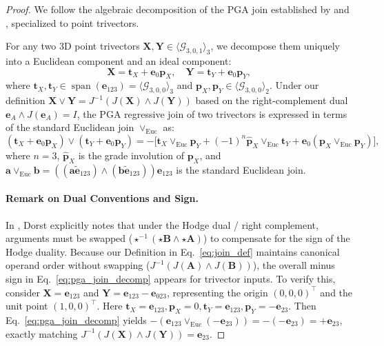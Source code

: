 \documentclass[10pt]{article}
\begin{document}
\begin{proof}
We follow the algebraic decomposition of the PGA join established by \citet[Eq.~35]{pga4cs2020} and \citet[Appendix~A.2, Proposition~7]{gatr}, specialized to point trivectors.

For any two 3D point trivectors $\mathbf{X}, \mathbf{Y} \in \langle \mathcal{G}_{3,0,1} \rangle_3$, we decompose them uniquely into a Euclidean component and an ideal component:
\begin{equation}
    \mathbf{X} = \mathbf{t}_X + \mathbf{e}_0 \mathbf{p}_X, \quad \mathbf{Y} = \mathbf{t}_Y + \mathbf{e}_0 \mathbf{p}_Y,
\end{equation}
where $\mathbf{t}_X, \mathbf{t}_Y \in \operatorname{span}(\mathbf{e}_{123}) = \langle \mathcal{G}_{3,0,0} \rangle_3$ and $\mathbf{p}_X, \mathbf{p}_Y \in \langle \mathcal{G}_{3,0,0} \rangle_2$. Under our definition $\mathbf{X} \vee \mathbf{Y} = J^{-1}(J(\mathbf{X}) \wedge J(\mathbf{Y}))$ based on the right-complement dual $\mathbf{e}_A \wedge J(\mathbf{e}_A) = I$, the PGA regressive join of two trivectors is expressed in terms of the standard Euclidean join $\vee_{\mathrm{Euc}}$ as:
\begin{equation}
    (\mathbf{t}_X + \mathbf{e}_0 \mathbf{p}_X) \vee (\mathbf{t}_Y + \mathbf{e}_0 \mathbf{p}_Y) = -\Big[ \mathbf{t}_X \vee_{\mathrm{Euc}} \mathbf{p}_Y + (-1)^n \hat{\mathbf{p}}_X \vee_{\mathrm{Euc}} \mathbf{t}_Y + \mathbf{e}_0 (\mathbf{p}_X \vee_{\mathrm{Euc}} \mathbf{p}_Y) \Big],
    \label{eq:pga_join_decomp}
\end{equation}
where $n=3$, $\hat{\mathbf{p}}_X$ is the grade involution of $\mathbf{p}_X$, and $\mathbf{a} \vee_{\mathrm{Euc}} \mathbf{b} = ((\mathbf{a} \tilde{\mathbf{e}}_{123}) \wedge (\mathbf{b} \tilde{\mathbf{e}}_{123})) \mathbf{e}_{123}$ is the standard Euclidean join.

\paragraph{Remark on Dual Conventions and Sign.}
In \citet[Eq.~36]{pga4cs2020}, Dorst explicitly notes that under the Hodge dual / right complement, arguments must be swapped ($\star^{-1}(\star \mathbf{B} \wedge \star \mathbf{A})$) to compensate for the sign of the Hodge duality. Because our Definition in Eq.~\ref{eq:join_def} maintains canonical operand order without swapping ($J^{-1}(J(\mathbf{A}) \wedge J(\mathbf{B}))$), the overall minus sign in Eq.~\ref{eq:pga_join_decomp} appears for trivector inputs. To verify this, consider $\mathbf{X} = \mathbf{e}_{123}$ and $\mathbf{Y} = \mathbf{e}_{123} - \mathbf{e}_{023}$, representing the origin $(0,0,0)^\top$ and the unit point $(1,0,0)^\top$. Here $\mathbf{t}_X = \mathbf{e}_{123}, \mathbf{p}_X = 0, \mathbf{t}_Y = \mathbf{e}_{123}, \mathbf{p}_Y = -\mathbf{e}_{23}$. Then Eq.~\ref{eq:pga_join_decomp} yields $-(\mathbf{e}_{123} \vee_{\mathrm{Euc}} (-\mathbf{e}_{23})) = -(-\mathbf{e}_{23}) = +\mathbf{e}_{23}$, exactly matching $J^{-1}(J(\mathbf{X}) \wedge J(\mathbf{Y})) = \mathbf{e}_{23}$.


\end{proof}
\end{document}
